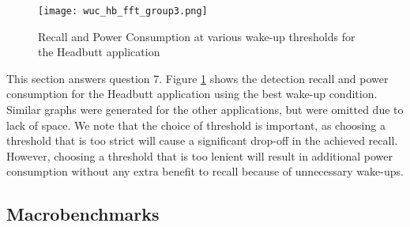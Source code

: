 \begin{figure}[h]
	\texttt{[image: wuc\_hb\_fft\_group3.png]}
	\caption{Recall and Power Consumption at various wake-up thresholds for the Headbutt application}
    \label{fig:wucHeadbuttFFTRecallPowerGroup3}
\end{figure}

This section answers question 7. Figure \ref{fig:wucHeadbuttFFTRecallPowerGroup3} shows the detection recall and power consumption for the Headbutt application using the best wake-up condition. Similar graphs were generated for the other applications, but were omitted due to lack of space. We note that the choice of threshold is important, as choosing a threshold that is too strict will cause a significant drop-off in the achieved recall. However, choosing a threshold that is too lenient will result in additional power consumption without any extra benefit to recall because of unnecessary wake-ups. 

\subsection{Macrobenchmarks}

